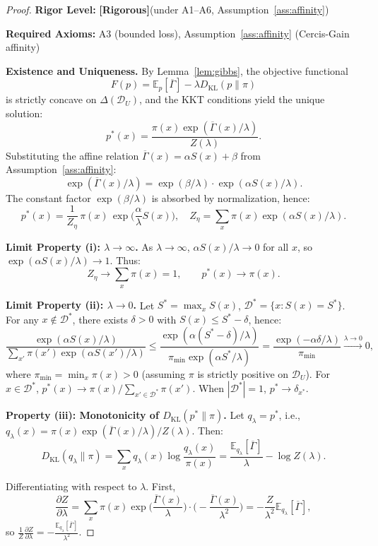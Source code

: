 \documentclass[12pt,a4paper]{article}
\newcommand{\E}{\mathbb{E}}
\newcommand{\cD}{\mathcal{D}}
\newcommand{\KL}{D_{\mathrm{KL}}}
\newcommand{\rigorous}{\textbf{[Rigorous]}}
\begin{document}
\begin{proof}
\textbf{Rigor Level:} \rigorous \quad (under A1--A6, Assumption~\ref{ass:affinity})

\textbf{Required Axioms:} A3 (bounded loss), Assumption~\ref{ass:affinity} (Cercis-Gain affinity)

\textbf{Existence and Uniqueness.}
By Lemma~\ref{lem:gibbs}, the objective functional
\[
F(p)=\E_p[\overline{\Gamma}] - \lambda\KL(p\|\pi)
\]
is strictly concave on $\Delta(\cD_U)$, and the KKT conditions yield the unique solution:
\[
p^*(x) = \frac{\pi(x)\exp(\overline{\Gamma}(x)/\lambda)}{Z(\lambda)}.
\]
Substituting the affine relation $\overline{\Gamma}(x)=\alpha S(x)+\beta$ from Assumption~\ref{ass:affinity}:
\[
\exp(\overline{\Gamma}(x)/\lambda) = \exp(\beta/\lambda)\cdot\exp(\alpha S(x)/\lambda).
\]
The constant factor $\exp(\beta/\lambda)$ is absorbed by normalization, hence:
\[
p^*(x) = \frac{1}{Z_\eta}\,\pi(x)\,\exp\!\Big(\frac{\alpha}{\lambda}S(x)\Big),\quad
Z_\eta = \sum_x \pi(x)\exp(\alpha S(x)/\lambda).
\]

\textbf{Limit Property (i): $\lambda\to\infty$.}
As $\lambda\to\infty$, $\alpha S(x)/\lambda\to 0$ for all $x$, so $\exp(\alpha S(x)/\lambda)\to 1$. Thus:
\[
Z_\eta \to \sum_x \pi(x) = 1,\qquad p^*(x) \to \pi(x).
\]

\textbf{Limit Property (ii): $\lambda\to 0$.}
Let $S^* = \max_x S(x)$, $\cD^* = \{x: S(x)=S^*\}$.
For any $x\notin\cD^*$, there exists $\delta>0$ with $S(x)\le S^*-\delta$, hence:
\[
\frac{\exp(\alpha S(x)/\lambda)}{\sum_{x'}\pi(x')\exp(\alpha S(x')/\lambda)}
\le \frac{\exp(\alpha(S^*-\delta)/\lambda)}{\pi_{\min}\exp(\alpha S^*/\lambda)}
= \frac{\exp(-\alpha\delta/\lambda)}{\pi_{\min}} \xrightarrow{\lambda\to0} 0,
\]
where $\pi_{\min}=\min_x\pi(x)>0$ (assuming $\pi$ is strictly positive on $\cD_U$).
For $x\in\cD^*$, $p^*(x)\to \pi(x)/\sum_{x'\in\cD^*}\pi(x')$.
When $|\cD^*|=1$, $p^*\to\delta_{x^*}$.

\textbf{Property (iii): Monotonicity of $\KL(p^*\|\pi)$.}
Let $q_\lambda = p^*$, i.e., $q_\lambda(x) = \pi(x)\exp(\overline{\Gamma}(x)/\lambda)/Z(\lambda)$.
Then:
\[
\KL(q_\lambda\|\pi) = \sum_x q_\lambda(x)\log\frac{q_\lambda(x)}{\pi(x)}
= \frac{\E_{q_\lambda}[\overline{\Gamma}]}{\lambda} - \log Z(\lambda).
\]

Differentiating with respect to $\lambda$. First,
\[
\frac{\partial Z}{\partial\lambda}
= \sum_x \pi(x)\exp\!\Big(\frac{\overline{\Gamma}(x)}{\lambda}\Big)\cdot\Big(-\frac{\overline{\Gamma}(x)}{\lambda^2}\Big)
= -\frac{Z}{\lambda^2}\E_{q_\lambda}[\overline{\Gamma}],
\]
so $\displaystyle\frac{1}{Z}\frac{\partial Z}{\partial\lambda} = -\frac{\E_{q_\lambda}[\overline{\Gamma}]}{\lambda^2}$.


\end{proof}
\end{document}
